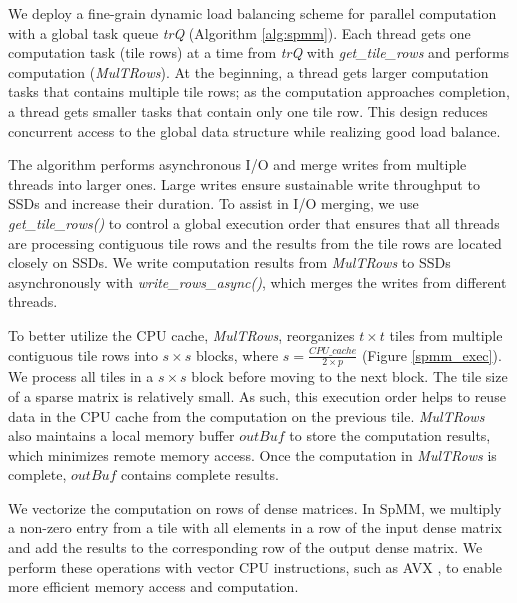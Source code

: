 We deploy a fine-grain dynamic load balancing scheme for parallel computation
with a global task queue \textit{trQ} (Algorithm \ref{alg:spmm}). Each thread
gets one computation task (tile rows) at a time from \textit{trQ} with
\textit{get\_tile\_rows} and performs computation (\textit{MulTRows}).
At the beginning, a thread gets larger computation tasks that contains multiple
tile rows; as the computation approaches completion, a thread gets smaller
tasks that contain only one tile row. This design reduces concurrent access to
the global data structure while realizing good load balance.

The algorithm performs asynchronous I/O and merge writes from multiple threads
into larger ones. Large writes ensure sustainable write throughput to SSDs and
increase their duration. To assist in I/O merging, we use
\textit{get\_tile\_rows()} to control a global execution
order that ensures that all threads are processing contiguous tile rows and
the results from the tile rows are located closely on SSDs.
We write computation results from \textit{MulTRows} to SSDs
asynchronously with \textit{write\_rows\_async()}, which merges the writes
from different threads.

To better utilize the CPU cache, \textit{MulTRows}, 
reorganizes $t \times t$
tiles from multiple contiguous tile rows into $s \times s$ blocks, where
$s = \frac{CPU\_cache}{2 \times p}$ (Figure \ref{spmm_exec}). We process all
tiles in a $s \times s$ block before moving to the next block. The tile size
of a sparse matrix is relatively small. As such, this execution order helps to
reuse data in the CPU cache from the computation on the previous tile.
\textit{MulTRows} also maintains
a local memory buffer $outBuf$ to store the computation results,
which minimizes remote memory access. Once the computation in \textit{MulTRows}
is complete, $outBuf$ contains complete results.

We vectorize the computation on rows of dense matrices.
In SpMM, we multiply a non-zero entry from a tile with all elements in
a row of the input dense matrix and add the results to the corresponding row
of the output dense matrix.
We perform these operations with vector CPU instructions, such as
AVX \cite{avx}, to enable more efficient memory access and computation.

